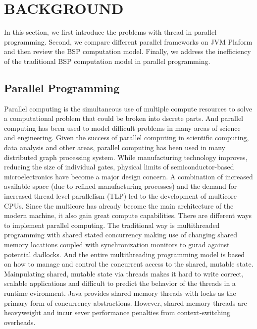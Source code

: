 \documentclass[twocolumn,a4paper,10pt]{article}
\begin{document}
\section{BACKGROUND}

In this section, we first introduce the problems with thread in parallel programming. Second, we compare different parallel frameworks on JVM Plaform and then review the BSP computation model. Finally, we address the inefficiency of the traditional BSP computation model in parallel programming.

\subsection{Parallel Programming}
Parallel computing is the simultaneous use of multiple compute resources to solve a computational problem that could be broken into dscrete parts. And parallel computing has been used to model difficult problems in many areas of science and engineering. Given the success of parallel computing in scientific computing, data analysis and other areas, parallel computing has been used in many distributed graph processing system.
While manufacturing technology improves, reducing the size of individual gates, physical limits of semiconductor-based microelectronics have become a major design concern. A combination of increased available space (due to refined manufacturing processes) and the demand for increased thread level parallelism (TLP) led to the development of multicore CPUs. Since the multicore has already become the main architecture of the modern machine, it also gain great compute capabilities. There are different ways to implement parallel computing. The traditional way is multithreaded programming with shared stated concurrency making use of changing shared memory locations coupled with synchronization monitors to gurad against potential dadlocks. And the entire multithreading programming model is based on how to manage and control the concurrent access to the shared, mutable state. Mainpulating shared, mutable state via threads makes it hard to write correct, scalable applications and difficult to predict the behavior of the threads in a runtime evironment. Java provides shared memory threads with locks as the primary form of concurrency abstractions. However, shared memory threads are heavyweight and incur sever performance penalties from context-switching overheads.\newline
\end{document}
